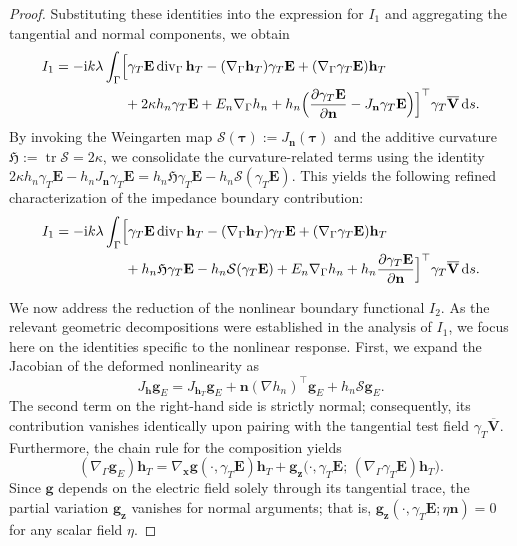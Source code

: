 \documentclass[12pt,reqno]{amsart}
\theoremstyle{definition}
\numberwithin{equation}{section}
\begin{document}
\begin{proof}
Substituting these identities into the expression for $I_1$ and aggregating the tangential and normal components, we obtain
\[
\begin{aligned}
I_1 &= -\mathrm{i}k\lambda \int_\Gamma \Bigl[ \gamma_T \mathbf{E} \operatorname{div}_\Gamma \mathbf{h}_T - (\nabla_\Gamma \mathbf{h}_T) \gamma_T \mathbf{E} + (\nabla_\Gamma \gamma_T \mathbf{E}) \mathbf{h}_T \\
&\qquad \qquad \quad + 2\kappa h_n \gamma_T \mathbf{E} + E_n \nabla_\Gamma h_n + h_n \Bigl( \frac{\partial \gamma_T \mathbf{E}}{\partial \mathbf{n}} - J_{\mathbf{n}} \gamma_T \mathbf{E} \Bigr) \Bigr]^{\top} \gamma_T \overline{\mathbf{V}} \,\mathrm{d}s.
\end{aligned}
\]
By invoking the Weingarten map $\mathcal{S}(\boldsymbol \tau) := J_{\mathbf{n}} (\boldsymbol \tau)$ and the additive  curvature $\mathfrak{H} := \operatorname{tr} \mathcal{S} = 2\kappa$, we consolidate the curvature-related terms using the identity $2\kappa h_n \gamma_T \mathbf{E} - h_n J_{\mathbf{n}} \gamma_T \mathbf{E} = h_n \mathfrak{H} \gamma_T \mathbf{E} - h_n \mathcal{S}(\gamma_T \mathbf{E})$. This yields the following refined characterization of the impedance boundary contribution:
\begin{equation}
\label{eq:I1_refined}
\begin{aligned}
I_1 &= -\mathrm{i}k\lambda \int_\Gamma \Bigl[ \gamma_T \mathbf{E} \operatorname{div}_\Gamma \mathbf{h}_T - (\nabla_\Gamma \mathbf{h}_T) \gamma_T \mathbf{E} + (\nabla_\Gamma \gamma_T \mathbf{E}) \mathbf{h}_T \\
&\qquad \qquad \quad + h_n \mathfrak{H} \gamma_T \mathbf{E} - h_n \mathcal{S}(\gamma_T \mathbf{E}) + E_n \nabla_\Gamma h_n + h_n \frac{\partial \gamma_T \mathbf{E}}{\partial \mathbf{n}} \Bigr]^{\top} \gamma_T \overline{\mathbf{V}} \,\mathrm{d}s.
\end{aligned}
\end{equation}

We now address the reduction of the nonlinear boundary functional $I_2$. As the relevant geometric decompositions were established in the analysis of $I_1$, we focus here on the identities specific to the nonlinear response. First, we expand the Jacobian of the deformed nonlinearity as
\[
J_{\mathbf{h}}\mathbf{g}_E = J_{\mathbf{h}_T}\mathbf{g}_E + \mathbf{n}(\nabla h_n)^{\top}\mathbf{g}_E + h_n \mathcal{S}\mathbf{g}_E.
\]
The second term on the right-hand side is strictly normal; consequently, its contribution vanishes identically upon pairing with the tangential test field $\gamma_T\overline{\mathbf{V}}$. Furthermore, the chain rule for the composition yields
\[
(\nabla_\Gamma \mathbf{g}_E) \mathbf{h}_T = \nabla_{\boldsymbol{x}}\mathbf{g}(\cdot,\gamma_T\mathbf{E})\mathbf{h}_T + \mathbf{g}_{\boldsymbol{z}} \bigl(\cdot,\gamma_T\mathbf{E};\, (\nabla_\Gamma\gamma_T\mathbf{E})\mathbf{h}_T\bigr).
\]
Since $\mathbf{g}$ depends on the electric field solely through its tangential trace, the partial variation $\mathbf{g}_{\boldsymbol{z}}$ vanishes for normal arguments; that is, $\mathbf{g}_{\boldsymbol{z}} (\cdot,\gamma_T\mathbf{E}; \eta\mathbf{n}) = 0$ for any scalar field $\eta$.


\end{proof}
\end{document}
